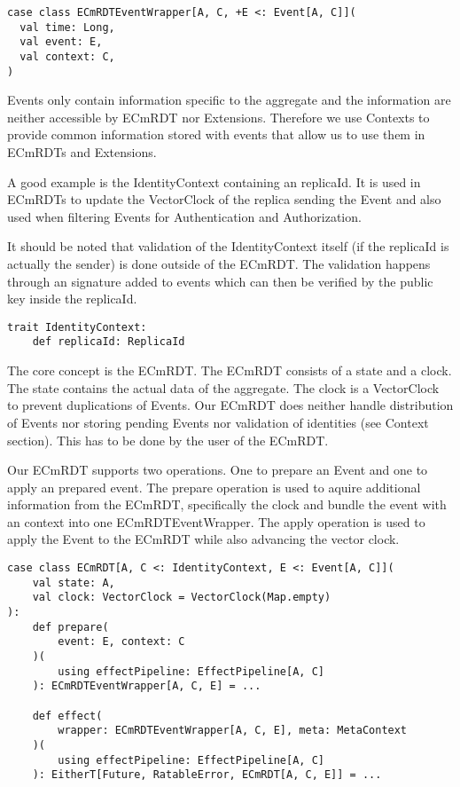 \documentclass[
	ngerman,
	ruledheaders=section,   %
	class=report,		    %
	thesis={type=bachelor}, %
	accentcolor=9c,			%
	custommargins=false,    %
	marginpar=false,        %
	parskip=half-,          %
	fontsize=11pt,          %
]{tudapub}
\begin{document}
\begin{lstlisting}
case class ECmRDTEventWrapper[A, C, +E <: Event[A, C]](
  val time: Long,
  val event: E,
  val context: C,
)
\end{lstlisting}

Events only contain information specific to the aggregate and the information are neither accessible by ECmRDT nor Extensions. Therefore we use Contexts to provide common information stored with events that allow us to use them in ECmRDTs and Extensions. 

A good example is the IdentityContext containing an replicaId. It is used in ECmRDTs to update the VectorClock of the replica sending the Event and also used when filtering Events for Authentication and Authorization.

It should be noted that validation of the IdentityContext itself (if the replicaId is actually the sender) is done outside of the ECmRDT. The validation happens through an signature added to events which can then be verified by the public key inside the replicaId.

\begin{lstlisting}
trait IdentityContext:
	def replicaId: ReplicaId
\end{lstlisting}

The core concept is the ECmRDT. The ECmRDT consists of a state and a clock. The state contains the actual data of the aggregate. The clock is a VectorClock to prevent duplications of Events. Our ECmRDT does neither handle distribution of Events nor storing pending Events nor validation of identities (see Context section). This has to be done by the user of the ECmRDT.

Our ECmRDT supports two operations. One to prepare an Event and one to apply an prepared event. The prepare operation is used to aquire additional information from the ECmRDT, specifically the clock and bundle the event with an context into one ECmRDTEventWrapper. The apply operation is used to apply the Event to the ECmRDT while also advancing the vector clock.

\begin{lstlisting}
case class ECmRDT[A, C <: IdentityContext, E <: Event[A, C]](
	val state: A,
	val clock: VectorClock = VectorClock(Map.empty)
):
	def prepare(
		event: E, context: C
	)(
		using effectPipeline: EffectPipeline[A, C]
	): ECmRDTEventWrapper[A, C, E] = ...

	def effect(
		wrapper: ECmRDTEventWrapper[A, C, E], meta: MetaContext
	)(
		using effectPipeline: EffectPipeline[A, C]
	): EitherT[Future, RatableError, ECmRDT[A, C, E]] = ...
\end{lstlisting}
\end{document}
